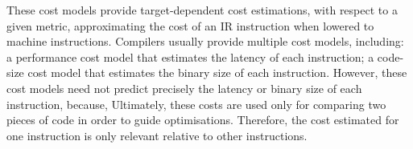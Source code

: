 These cost models provide target-dependent cost estimations, with respect to a given metric, 
approximating the cost of an IR instruction when lowered to machine instructions.
Compilers usually provide multiple cost models, including: a performance cost model that estimates the latency of each instruction; a code-size cost model that estimates the binary size of each instruction.
However, these cost models need not predict precisely the latency or binary size of each instruction, because, Ultimately, these costs are used only for comparing two pieces of code in order to guide optimisations.
Therefore, the cost estimated for one instruction is only relevant relative to other instructions.


